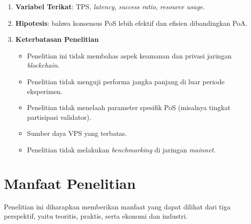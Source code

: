 \begin{enumerate}
    \item \textbf{Variabel Terikat}: TPS, \textit{latency}, \textit{success ratio}, \textit{resource usage}.
    
    \item \textbf{Hipotesis}: bahwa konsensus PoS lebih efektif dan efisien dibandingkan PoA.
    
    \item \textbf{Keterbatasan Penelitian}
    \begin{itemize}
        \item Penelitian ini tidak membahas aspek keamanan dan privasi jaringan \textit{blockchain}.
        \item Penelitian tidak menguji performa jangka panjang di luar periode eksperimen.
        \item Penelitian tidak menelaah parameter spesifik PoS (misalnya tingkat partisipasi validator).
        \item Sumber daya VPS yang terbatas.
        \item Penelitian tidak melakukan \textit{benchmarking} di jaringan \textit{mainnet}.
    \end{itemize}
\end{enumerate}

\section{Manfaat Penelitian}
Penelitian ini diharapkan memberikan manfaat yang dapat dilihat dari tiga perspektif, yaitu teoritis, praktis, serta ekonomi dan industri.

